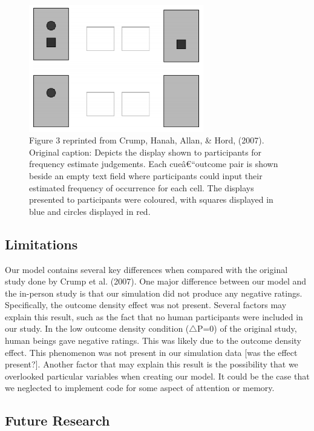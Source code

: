 \documentclass[
  english,
  man,floatsintext]{apa6}
\begin{document}
\begin{figure}

{\centering \includegraphics[width=3in]{imgs/crump_figure3} 

}

\caption{Figure 3 reprinted from Crump, Hanah, Allan, \& Hord, (2007). Original caption: Depicts the display shown to participants for frequency estimate judgements. Each cueâ€“outcome pair is shown beside an empty text field where participants could input their estimated frequency of occurrence for each cell. The displays presented to participants were coloured, with squares displayed in blue and circles displayed in red.}\label{fig:unnamed-chunk-8}
\end{figure}

\hypertarget{limitations}{%
\subsection{Limitations}\label{limitations}}

Our model contains several key differences when compared with the original study done by Crump et al. (2007). One major difference between our model and the in-person study is that our simulation did not produce any negative ratings. Specifically, the outcome density effect was not present. Several factors may explain this result, such as the fact that no human participants were included in our study. In the low outcome density condition (\(\triangle\)P=0) of the original study, human beings gave negative ratings. This was likely due to the outcome density effect. This phenomenon was not present in our simulation data {[}was the effect present?{]}. Another factor that may explain this result is the possibility that we overlooked particular variables when creating our model. It could be the case that we neglected to implement code for some aspect of attention or memory.

\hypertarget{future-research}{%
\subsection{Future Research}\label{future-research}}
\end{document}
